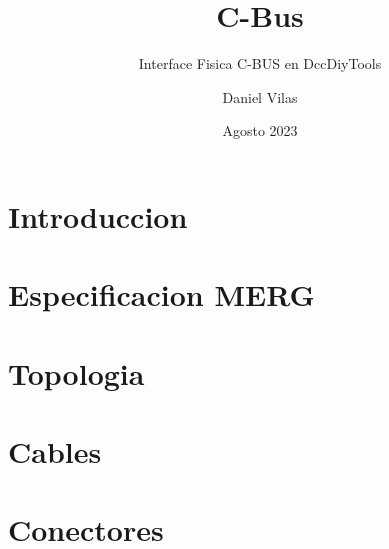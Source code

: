 \documentclass[spanish]{DccDiyTools/DccDiyTools}
\title{C-Bus}
\subtitle{Interface Fisica C-BUS en DccDiyTools}
\author{Daniel Vilas}
\date{Agosto 2023}
\begin{document}
\maketitle
\newpage
\section{Introduccion}

\section{Especificacion MERG}
\section{Topologia}


\section{Cables}
\section{Conectores}

\end{document}

